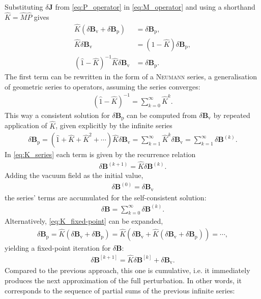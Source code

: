 \documentclass[a4paper, twoside, 10pt, english]{article}
\numberwithin{equation}{section}
\let\vec\symbf
\newcommand*\Bvac{\ensuremath{\delta \vec{B}_{\text{v}}}}  %
\newcommand*\Bplas{\ensuremath{\delta \vec{B}_{\text{p}}}}  %
\newcommand*\Bpert{\ensuremath{\delta \vec{B}}}  %
\begin{document}
Substituting $\delta \vec{J}$ from \cref{eq:P_operator} in \cref{eq:M_operator} and using a shorthand $\hat{K} = \hat{M} \hat{P}$ gives
\begin{align}
  \hat{K} \left ( \Bvac + \Bplas \right ) &= \Bplas, \label{eq:K_fixed-point} \\
  \hat{K} \Bvac &= \left ( \hat{1} - \hat{K} \right ) \Bplas, \\
  \left ( \hat{1} - \hat{K} \right )^{-1} \hat{K} \Bvac &= \Bplas.
\end{align}
The first term can be rewritten in the form of a \textsc{Neumann} series, a generalisation of geometric series to operators, assuming the series converges:
\begin{gather}
  \left ( \hat{1} - \hat{K} \right )^{-1} = \sum_{k = 0}^{\infty} \hat{K}^{k}. \label{eq:Neumann_series}
\end{gather}
This way a consistent solution for $\Bplas$ can be computed from $\Bvac$ by repeated application of $\hat{K}$, given explicitly by the infinite series
\begin{gather}
  \Bplas = \left ( \hat{1} + \hat{K} + \hat{K}^{2} + \dotsb \right ) \hat{K} \Bvac = \sum_{k = 1}^{\infty} \hat{K}^{k} \Bvac = \sum_{k = 1}^{\infty} \Bpert^{(k)}. \label{eq:K_series}
\end{gather}
In \cref{eq:K_series} each term is given by the recurrence relation
\begin{gather}
  \Bpert^{(k+1)} = \hat{K} \Bpert^{(k)}.
\end{gather}
Adding the vacuum field as the initial value,
\begin{gather}
  \Bpert^{(0)} = \Bvac
\end{gather}
the series' terms are accumulated for the self-consistent solution:
\begin{gather}
  \Bpert = \sum_{k = 0}^{\infty} \Bpert^{(k)}.
\end{gather}
Alternatively, \cref{eq:K_fixed-point} can be expanded,
\begin{gather}
  \Bplas = \hat{K} \left ( \Bvac + \Bplas \right ) = \hat{K} \left ( \Bvac + \hat{K} \left ( \Bvac + \Bplas \right ) \right ) = \dotsb,
\end{gather}
yielding a fixed-point iteration for $\Bpert$:
\begin{gather}
  \Bpert^{[k+1]} = \hat{K} \Bpert^{[k]} + \Bvac.
\end{gather}
Compared to the previous approach, this one is cumulative, i.e. it immediately produces the next approximation of the full perturbation. In other words, it corresponds to the sequence of partial sums of the previous infinite series:
\end{document}
